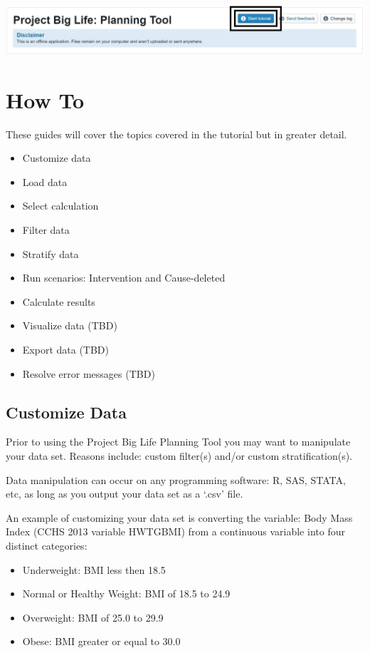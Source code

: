 \documentclass[]{book}
\providecommand{\tightlist}{%
  \setlength{\itemsep}{0pt}\setlength{\parskip}{0pt}}
\begin{document}
\begin{center}\includegraphics{Tutorial Button} \end{center}

\chapter{How To}\label{howto}

These guides will cover the topics covered in the tutorial but in
greater detail.

\begin{itemize}
\tightlist
\item
  Customize data
\item
  Load data
\item
  Select calculation
\item
  Filter data
\item
  Stratify data
\item
  Run scenarios: Intervention and Cause-deleted
\item
  Calculate results
\item
  Visualize data (TBD)
\item
  Export data (TBD)
\item
  Resolve error messages (TBD)
\end{itemize}

\section{Customize Data}\label{customize-data}

Prior to using the Project Big Life Planning Tool you may want to
manipulate your data set. Reasons include: custom filter(s) and/or
custom stratification(s).

Data manipulation can occur on any programming software: R, SAS, STATA,
etc, as long as you output your data set as a `.csv' file.

An example of customizing your data set is converting the variable: Body
Mass Index (CCHS 2013 variable HWTGBMI) from a continuous variable into
four distinct categories:

\begin{itemize}
\tightlist
\item
  Underweight: BMI less then 18.5
\item
  Normal or Healthy Weight: BMI of 18.5 to 24.9
\item
  Overweight: BMI of 25.0 to 29.9
\item
  Obese: BMI greater or equal to 30.0
\end{itemize}
\end{document}
